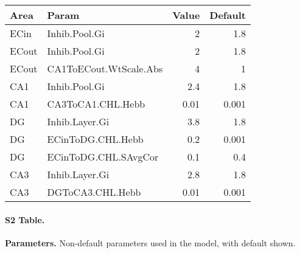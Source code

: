 \documentclass[10pt,letterpaper]{article}
\begin{document}
  

\begin{table}[hbt!]
    \begin{tabular}{|l|l|r|r|}
    \hline
    Area & Param & Value & Default \\
    \hline
    ECin & Inhib.Pool.Gi & 2 & 1.8 \\
    \hline
    ECout & Inhib.Pool.Gi & 2 & 1.8 \\
    \hline
    ECout & CA1ToECout.WtScale.Abs & 4 & 1 \\
    \hline
    CA1 & Inhib.Pool.Gi & 2.4  & 1.8  \\
    \hline
    CA1 & CA3ToCA1.CHL.Hebb & 0.01 & 0.001 \\
    \hline
    DG & Inhib.Layer.Gi & 3.8 & 1.8 \\
    \hline
    DG & ECinToDG.CHL.Hebb & 0.2 & 0.001 \\
    \hline
    DG & ECinToDG.CHL.SAvgCor & 0.1 & 0.4 \\
    \hline
    CA3 & Inhib.Layer.Gi & 2.8 & 1.8 \\
    \hline
    CA3 & DGToCA3.CHL.Hebb & 0.01 & 0.001 \\
    \hline
    \end{tabular}
  \end{table}

\paragraph*{S2 Table.}
\label{S2_Table}
{\bf Parameters.}  Non-default parameters used in the model, with default shown.
\end{document}
